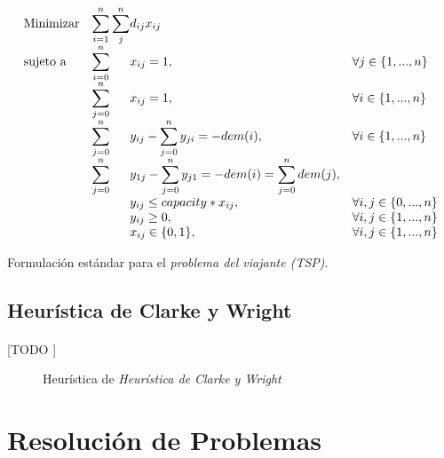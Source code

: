 \documentclass[spanish]{article}
\begin{document}
			\begin{eqfloat}
				\begin{equation}
					\begin{array}{ll@{}ll}
						\text{Minimizar}	& \displaystyle\sum\limits_{i = 1}^{n}	\sum\limits_{j}^{n} & d_{ij}x_{ij} & \\
						\text{sujeto a}		& \displaystyle\sum\limits_{i = 0}^{n}	&	x_{ij} 	= 1, 	& \forall j \in \{1,...,n\}\\
															& \displaystyle\sum\limits_{j = 0}^{n}	&	x_{ij} 	= 1,	& \forall i \in \{1,...,n\}\\
															& \displaystyle\sum\limits_{j = 0}^{n}	&	y_{ij} - \displaystyle\sum\limits_{j = 0}^{n}	y_{ji} = -dem(i),  & \forall i \in \{1,...,n\}\\
															& \displaystyle\sum\limits_{j = 0}^{n}	&	y_{1j} - \displaystyle\sum\limits_{j = 0}^{n}	y_{j1} = -dem(i)	= \displaystyle\sum\limits_{j = 0}^{n} dem(j),  &\\
															&																				&	y_{ij} 	\leq capacity * x_{ij},  & \forall i,j \in \{0,...,n\}\\
															&                               				&	y_{ij} 	\geq 0, 	& \forall i,j \in \{1,...,n\} \\
															&                               				&	x_{ij} 	\in \{0,1\}, 	& \forall i,j \in \{1,...,n\}
					\end{array}
				\end{equation}
				\caption{Formulación estándar para el \emph{problema del viajante (TSP)}.}
				\label{eq:tsp_basic}
			\end{eqfloat}

		\subsection{Heurística de Clarke y Wright}
		\label{sec:clarke_wright}

			\paragraph{}
			[TODO ]

			\begin{figure}
	      \centering
	      \caption{Heurística de \emph{Heurística de Clarke y Wright}}
	      \label{code:clarke_wright}
	    \end{figure}

	\section{Resolución de Problemas}
\end{document}
